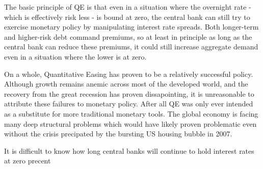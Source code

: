 \documentclass[12pt]{report}
\begin{document}
The basic principle of QE is that even in a situation where the overnight rate - which is effectively risk less - is bound at zero, the central bank can still try to exercise monetary policy by manipulating interest rate spreads.\autocite[466]{blinder2010quantitative}
Both longer-term and higher-risk debt command premiums, so at least in principle as long as the central bank can reduce these premiums, it could still increase aggregate demand even in a situation where the lower is at zero.\autocite[466]{blinder2010quantitative}

On a whole, Quantitative Easing has proven to be a relatively successful policy.
Although growth remains anemic across most of the developed world, and the recovery from the great recession has proven dissapointing, it is unreasonable to attribute these failures to monetary policy.
After all QE was only ever intended as a substitute for more traditional monetary tools.
The global economy is facing many deep structural problems which would have likely proven problematic even without the crisis precipated by the bursting US housing bubble in 2007.

It is difficult to know how long central banks will continue to hold interest rates at zero precent

\begin{appendices}


\end{appendices}

\nocite{*}
\printbibliography
\end{document}
